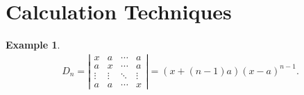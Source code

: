 \documentclass{report}
\newtheorem{example}{Example}[section]
\theoremstyle{nonumberplain}
\begin{document}
\section{Calculation Techniques}
\begin{example}\label{example:Upper triangularization}
	\begin{align*}
		D_{n}=\left|\begin{array}{cccc}
			x      & a      & \cdots & a      \\
			a      & x      & \cdots & a      \\
			\vdots & \vdots & \ddots & \vdots \\
			a      & a      & \cdots & x
		\end{array}\right|=\left(x+(n-1)a\right)\left(x-a\right)^{n-1}.
	\end{align*}
\end{example}
\end{document}
